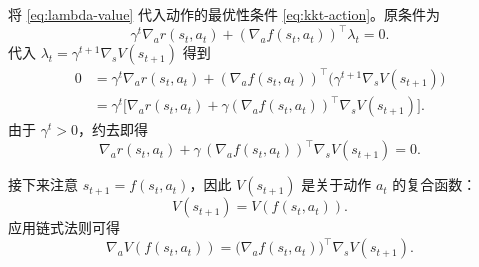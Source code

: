 将 \eqref{eq:lambda-value} 代入动作的最优性条件 \eqref{eq:kkt-action}。原条件为
\begin{equation}
    \gamma^{t}\nabla_a r(s_t,a_t)
    +
    \left(\nabla_a f(s_t,a_t)\right)^{\!\top} \lambda_t
    =0.
\end{equation}
代入 
\(
\lambda_t=\gamma^{t+1}\nabla_s V(s_{t+1})
\)
得到
\begin{align}
0
&= \gamma^{t}\nabla_a r(s_t,a_t)
   +\left(\nabla_a f(s_t,a_t)\right)^{\!\top} 
      \big(\gamma^{t+1}\nabla_s V(s_{t+1})\big)  \\
&= \gamma^{t}\Big[
        \nabla_a r(s_t,a_t)
        +\gamma
        \left(\nabla_a f(s_t,a_t)\right)^{\!\top} 
        \nabla_s V(s_{t+1})
    \Big].
\end{align}
由于 $\gamma^t>0$，约去即得
\begin{equation}
    \nabla_a r(s_t,a_t)
    +\gamma\,
    \left(\nabla_a f(s_t,a_t)\right)^{\!\top}\nabla_s V(s_{t+1})
    =0.
    \label{eq:kkt-expand-final}
\end{equation}



接下来注意 $s_{t+1}=f(s_t,a_t)$，因此 $V(s_{t+1})$ 是关于动作 $a_t$ 的复合函数：
\[
V(s_{t+1}) = V(f(s_t,a_t)).
\]
应用链式法则可得
\begin{equation}
\nabla_a V(f(s_t,a_t))
    =
    \big(\nabla_a f(s_t,a_t)\big)^{\!\top}
    \nabla_s V(s_{t+1}).  
    \label{eq:chain-rule}
\end{equation}


\begin{center}
\end{center}




